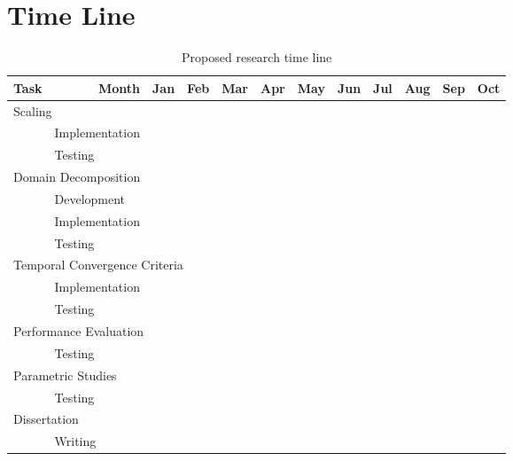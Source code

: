\section{Time Line}
\label{sect:proposal_time_line}

\newcommand{\cc}{\cellcolor{black}}
\begin{table}[ht]
\singlespace
\centering
\begin{tabular}{@{}l l c c c c  c c c c c c @{}} \toprule
Task & \multicolumn{1}{r}{Month} & Jan & Feb & Mar & Apr & May & Jun & Jul & Aug & Sep & Oct\\
\midrule
\multicolumn{12}{l}{Scaling}  \\
& Implementation & \cc & \cc &     &     &     &     &     &     &     &     \\
& Testing        &     & \cc & \cc &     &     &     &     &     &     &     \\
\multicolumn{12}{l}{Domain Decomposition} \\
& Development    & \cc & \cc &     &     &     &     &     &     &     &     \\
& Implementation &     & \cc & \cc & \cc & \cc &     &     &     &     &     \\
& Testing        &     &     &     &     & \cc & \cc &     &     &     &     \\
\multicolumn{12}{l}{Temporal Convergence Criteria}\\
& Implementation & \cc & \cc &     &     &     &     &     &     &     &     \\
& Testing        &     &     & \cc & \cc &     &     &     &     &     &     \\
\multicolumn{12}{l}{Performance Evaluation} \\
& Testing        &     &     &     &     &     & \cc & \cc &     &     &     \\
\multicolumn{12}{l}{Parametric Studies} \\
& Testing        &     &     &     &     &     & \cc & \cc & \cc &     &     \\
\multicolumn{12}{l}{Dissertation} \\
& Writing        & \cc & \cc & \cc & \cc & \cc & \cc & \cc & \cc & \cc & \cc \\
\bottomrule  
\end{tabular}
\caption{Proposed research time line}
\label{tab:time_line}
\end{table}

